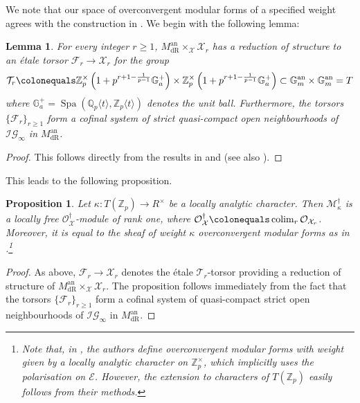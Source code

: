 \documentclass[10pt, oneside]{amsart}
\newcommand{\defeq}{\colonequals}
\numberwithin{equation}{subsection}
\newtheorem{proposition}[equation]{Proposition}
\newtheorem{lemma}[equation]{Lemma}
\theoremstyle{definition}
\theoremstyle{remark}
\newcommand{\mbb}[1]{\mathbb{#1}}
\newcommand{\opn}[1]{\operatorname{#1}}
\begin{document}
We note that our space of overconvergent modular forms of a specified weight agrees with the construction in \cite{HaloSpectral}. We begin with the following lemma:

\begin{lemma} \label{ReductionsOfStructureOfMdRLemma}
    For every integer $r \geq 1$, $M_{\opn{dR}}^{\opn{an}} \times_{\mathcal{X}} \mathcal{X}_r$ has a reduction of structure to an \'{e}tale torsor $\mathcal{F}_r \to \mathcal{X}_r$ for the group
    \[
    \mathcal{T}_r \defeq \mbb{Z}_p^{\times} \left( 1 + p^{r+1 - \frac{1}{p-1}} \mbb{G}_a^+ \right) \times \mbb{Z}_p^{\times} \left( 1 + p^{r+1 - \frac{1}{p-1}} \mbb{G}_a^+ \right) \subset \mbb{G}_m^{\opn{an}} \times \mbb{G}_m^{\opn{an}} = T
    \]
    where $\mbb{G}_a^+ = \opn{Spa}(\mbb{Q}_p\langle t \rangle, \mbb{Z}_p\langle t \rangle )$ denotes the unit ball. Furthermore, the torsors $\{ \mathcal{F}_r \}_{r \geq 1}$ form a cofinal system of strict quasi-compact open neighbourhoods of $\mathcal{IG}_{\infty}$ in $M_{\opn{dR}}^{\opn{an}}$.
\end{lemma}
\begin{proof}
    This follows directly from the results in \cite{Pilloni} and \cite{AIS} (see also \cite[Proposition 5.15]{BoxerPilloni}). 
\end{proof}

This leads to the following proposition.

\begin{proposition} \label{PropLocallyFree}
Let $\kappa: T(\mbb{Z}_p) \to R^\times$ be a locally analytic character. Then $\mathcal{M}^\dagger_\kappa$ is a locally free $\mathcal{O}_{\mathcal{X}}^{\dagger}$-module of rank one, where $\mathcal{O}_{\mathcal{X}}^{\dagger} \defeq \opn{colim}_r \mathcal{O}_{\mathcal{X}_r}$. Moreover, it is equal to the sheaf of weight $\kappa$ overconvergent modular forms as in \cite{HaloSpectral}.\footnote{Note that, in \cite{HaloSpectral}, the authors define overconvergent modular forms with weight given by a locally analytic character on $\mbb{Z}_p^{\times}$, which implicitly uses the polarisation on $\mathcal{E}$. However, the extension to characters of $T(\mbb{Z}_p)$ easily follows from their methods.} 
\end{proposition}
\begin{proof}
As above, $\mathcal{F}_r \to \mathcal{X}_r$ denotes the \'{e}tale $\mathcal{T}_r$-torsor providing a reduction of structure of $M_{\opn{dR}}^{\opn{an}} \times_{\mathcal{X}} \mathcal{X}_r$. The proposition follows immediately from the fact that the torsors $\{\mathcal{F}_r\}_{r \geq 1}$ form a cofinal system of quasi-compact strict open neighbourhoods of $\mathcal{IG}_{\infty}$ in $M_{\opn{dR}}^{\opn{an}}$.
\end{proof}
\end{document}
